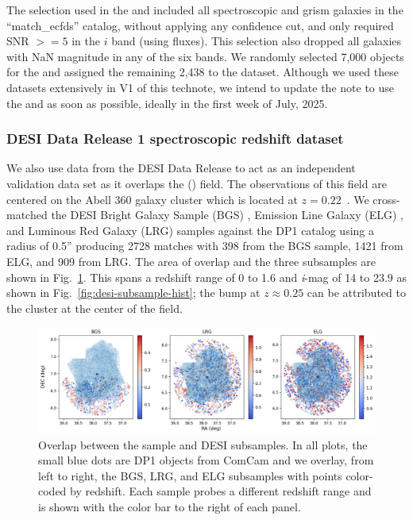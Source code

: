 The  selection used in the  and  
included all spectroscopic and grism galaxies in the ``match\_ecfds'' catalog, without applying 
any confidence cut, and only required SNR $>= 5$ in the $i$ band (using  fluxes).   
This selection also dropped all galaxies with NaN magnitude in any of the six bands.
We randomly selected 7,000 objects for the  and assigned the remaining 2,438 to the 
  dataset. Although we used these datasets extensively in V1 of this technote, 
we intend to update the note to use the  and  as soon as possible, 
ideally in the first week of July, 2025.


\subsubsection{DESI Data Release 1 spectroscopic redshift dataset}
\label{sec:data:desi}

We also use data from the DESI Data Release \citep{desi-dr1} to act as an independent validation data set as it overlaps the  () field.
The observations of this field are centered on the Abell 360 galaxy cluster which is located at $z=0.22$~\citep{A360z}.
We cross-matched the DESI Bright Galaxy Sample (BGS) \citep{BGS}, Emission Line Galaxy (ELG) \citep{ELG}, and Luminous Red Galaxy (LRG) \citep{LRG} samples against the DP1 catalog using a radius of 0.5'' producing 2728  matches with 398 from the BGS sample, 1421 from ELG, and 909 from LRG.
The area of overlap and the three subsamples are shown in Fig.~\ref{fig:desi-overlap}.
This spans a redshift range of 0 to 1.6 and \textit{i}-mag of 14 to 23.9 as shown in Fig.~\ref{fig:desi-subsample-hist}; the bump at $z\approx0.25$ can be attributed to the cluster at the center of the field.


\begin{figure}[ht]
    \centering
    \includegraphics[width=\linewidth]{figures/desi_sample_overlap.png}
    \caption{Overlap between the  sample and DESI subsamples. In all plots, the small blue dots are DP1 objects from ComCam and we overlay, from left to right, the BGS, LRG, and ELG subsamples with points color-coded by redshift. Each sample probes a different redshift range and is shown with the color bar to the right of each panel.}
    \label{fig:desi-overlap}
\end{figure}

